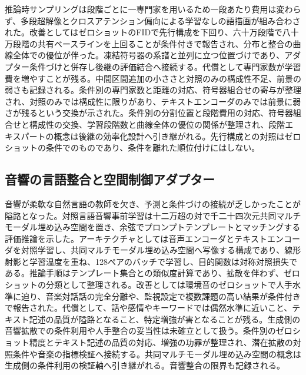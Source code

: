 \documentclass[lualatex,a4paper,10pt]{jlreq}
\begin{document}
推論時サンプリングは段階ごとに一専門家を用いるため一段あたり費用は変わらず、多段超解像とクロスアテンション偏向による学習なしの語描画が組み合わされた\autocite{btd034}。改善としてはゼロショットのFIDで先行構成を下回り、六十万段階で八十万段階の共有ベースラインを上回ることが条件付きで報告され、分布と整合の曲線全体での優位が伴った\autocite{btd034}。凍結符号器の系譜と並列に立つ位置づけであり、アダプター条件づけと併存し後継の評価結合へ接続する。代償として専門家数が学習費を増やすことが残る\autocite{btd034}。中間区間追加の小ささと対照のみの構成性不足、前景の弱さも記録される。条件別の専門家数と距離の対応、符号器組合せの寄与が整理され、対照のみでは構成性に限りがあり、テキストエンコーダのみでは前景に弱さが残るという交換が示された\autocite{btd034}。条件別の分割位置と段階費用の対応、符号器組合せと構成性の交換、学習段階数と曲線全体の優位の関係が整理され、段階エキスパートの概念は後継の効率化設計へ引き継がれる。先行構成との対照はゼロショットの条件でのものであり、条件を離れた順位付けにはしない。

\subsection{音響の言語整合と空間制御アダプター}
音響が柔軟な自然言語の教師を欠き、予測と条件づけの接続が乏しかったことが隘路となった。対照言語音響事前学習は十二万超の対で千二十四次元共同マルチモーダル埋め込み空間を置き、余弦でプロンプトテンプレートとマッチングする評価推論を示した\autocite{btd035}。アーキテクチャとしては音声エンコーダとテキストエンコーダを対照学習し、共同マルチモーダル埋め込み空間へ写像する構成であり、線形射影と学習温度を重ね、128ペアのバッチで学習し、目的関数は対称対照損失である\autocite{btd035}。推論手順はテンプレート集合との類似度計算であり、拡散を伴わず、ゼロショットの分類として整理される\autocite{btd035}。改善としては環境音のゼロショットで人手水準に迫り、音楽対話話の完全分離や、監視設定で複数課題の高い結果が条件付きで報告された\autocite{btd035}。代償として、話や感情やキーワードでは偶然水準に近いこと、テキスト記述の品質が隘路となること、特定増強が害となることが残る\autocite{btd035}。生成側の音響拡散での条件利用や人手整合の妥当性は未確立として扱う。条件別のゼロショット精度とテキスト記述の品質の対応、増強の功罪が整理され、潜在拡散の対照条件や音楽の指標検証へ接続する。共同マルチモーダル埋め込み空間の概念は生成側の条件利用の検証軸へ引き継がれる\autocite{btd035}。音響整合の限界も記録される。
\end{document}
